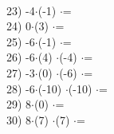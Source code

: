 \documentclass[a4paper,10pt]{article}
\begin{document}
\vspace{0.5cm}\\23)   -4$\cdot$(-1) $\cdot$=
\vspace{0.5cm}\\24)   0$\cdot$(3) $\cdot$=
\vspace{0.5cm}\\25)   -6$\cdot$(-1) $\cdot$=
\vspace{0.5cm}\\26)   -6$\cdot$(4) $\cdot$(-4) $\cdot$=
\vspace{0.5cm}\\27)   -3$\cdot$(0) $\cdot$(-6) $\cdot$=
\vspace{0.5cm}\\28)   -6$\cdot$(-10) $\cdot$(-10) $\cdot$=
\vspace{0.5cm}\\29)   8$\cdot$(0) $\cdot$=
\vspace{0.5cm}\\30)   8$\cdot$(7) $\cdot$(7) $\cdot$=
\vspace{0.5cm}\\\pagebreak
\end{document}
